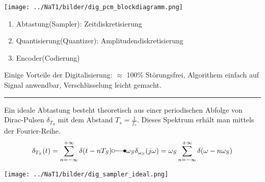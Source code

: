 
\begin{center}
	\texttt{[image: ../NaT1/bilder/dig\_pcm\_blockdiagramm.png]}
\end{center}
\begin{enumerate}
  \item Abtastung(Sampler): Zeitdiskretisierung 
  \item Quantisierung(Quantizer): Amplitudendiskretisierung
  \item Encoder(Codierung)
\end{enumerate}

Einige Vorteile der Digitalisierung: $\approx$ 100\% Störungsfrei, Algorithem einfach auf Signal
anwendbar, Verschlüsselung leicht gemacht.\\

\hrule
{}
Ein ideale Abtastung besteht theoretisch aus einer periodischen Abfolge von Dirac-Pulsen
$\delta_{T_S}$ mit dem Abstand $T_s = \frac{1}{f_s}$. Dieses Spektrum erhält man mittels der
Fourier-Reihe. \\ 
$$ \delta_{T_S}(t) = \sum\limits_{n=-\infty}^{+\infty} \delta(t-nT_S) \laplace 
\omega_S \delta_{\omega_S} (j \omega) = 
\omega_S \sum\limits_{n=-\infty}^{+\infty} \delta(\omega - n \omega_S)$$
	\begin{center}
		\texttt{[image: ../NaT1/bilder/dig\_sampler\_ideal.png]}
	\end{center}

